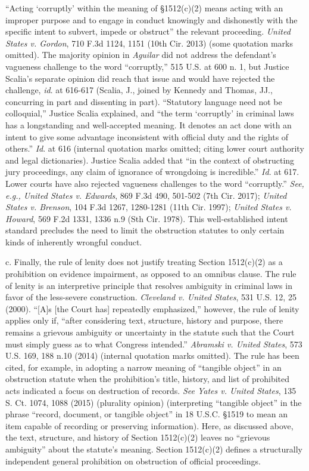 “Acting ‘corruptly’ within the meaning of \S 1512(c)(2) means acting with an improper purpose and to engage in conduct knowingly and dishonestly with the specific intent to subvert, impede or obstruct” the relevant proceeding.
\textit{United States v. Gordon}, 710 F.3d 1124, 1151 (10th Cir. 2013) (some quotation marks omitted).
The majority opinion in \textit{Aguilar} did not address the defendant’s vagueness challenge to the word “corruptly,” 515 U.S. at 600 n. 1, but Justice Scalia’s separate opinion did reach that issue and would have rejected the challenge, \textit{id}. at 616-617 (Scalia, J., joined by Kennedy and Thomas, JJ., concurring in part and dissenting in part).
“Statutory language need not be colloquial,” Justice Scalia explained, and “the term ‘corruptly’ in criminal laws has a longstanding and well-accepted meaning.
It denotes an act done with an intent to give some advantage inconsistent with official duty and the rights of others.”
\textit{Id}. at 616 (internal quotation marks omitted; citing lower court authority and legal dictionaries).
Justice Scalia added that “in the context of obstructing jury proceedings, any claim of ignorance of wrongdoing is incredible.”
\textit{Id}. at 617.
Lower courts have also rejected vagueness challenges to the word “corruptly.”
\textit{See, e.g., United States v. Edwards}, 869 F.3d 490, 501-502 (7th Cir. 2017);
\textit{United States v. Brenson}, 104 F.3d 1267, 1280-1281 (11th Cir. 1997);
\textit{United States v. Howard}, 569 F.2d 1331, 1336 n.9 (Sth Cir. 1978).
This well-established intent standard precludes the need to limit the obstruction statutes to only certain kinds of inherently wrongful conduct.%

c. Finally, the rule of lenity does not justify treating Section 1512(c)(2) as a prohibition on evidence impairment, as opposed to an omnibus clause.
The rule of lenity is an interpretive principle that resolves ambiguity in criminal laws in favor of the less-severe construction.
\textit{Cleveland v. United States}, 531 U.S. 12, 25 (2000).
“[A]s [the Court has] repeatedly emphasized,” however, the rule of lenity applies only if, “after considering text, structure, history and purpose, there remains a grievous ambiguity or uncertainty in the statute such that the Court must simply guess as to what Congress intended.”
\textit{Abramski v. United States}, 573 U.S. 169, 188 n.10 (2014) (internal quotation marks omitted).
The rule has been cited, for example, in adopting a narrow meaning of “tangible object” in an obstruction statute when the prohibition’s title, history, and list of prohibited acts indicated a focus on destruction of records.
\textit{See Yates v. United States}, 135 S. Ct. 1074, 1088 (2015) (plurality opinion) (interpreting “tangible object” in the phrase “record, document, or tangible object” in 18 U.S.C. \S 1519 to mean an item capable of recording or preserving information).
Here, as discussed above, the text, structure, and history of Section 1512(c)(2) leaves no “grievous ambiguity” about the statute’s meaning.
Section 1512(c)(2) defines a structurally independent general prohibition on obstruction of official proceedings.

